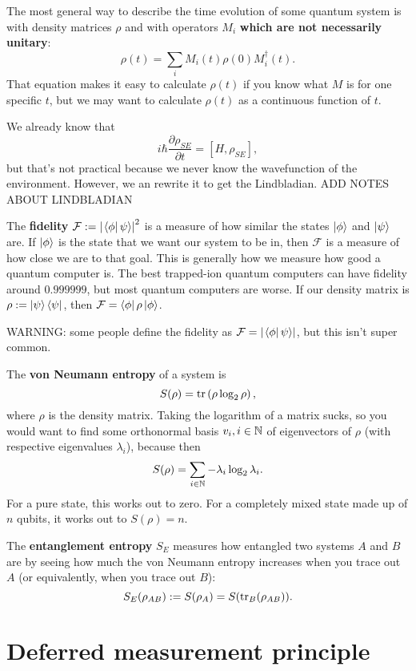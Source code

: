 \documentclass{article}
\begin{document}
\par
The most general way to describe the time evolution of some quantum system is with density matrices $\rho$ and with operators $M_i$ \textbf{which are not necessarily unitary}:
\[ \rho(t) = \sum_i M_i(t) \rho(0) M_i^\dag(t). \]
That equation makes it easy to calculate $\rho(t)$ if you know what $M$ is for one specific $t$, but we may want to calculate $\rho(t)$ as a continuous function of $t$.
\par
We already know that
\[ i\hbar \frac{\partial \rho_{SE}}{\partial t} = \left[ H, \rho_{SE} \right], \]
but that's not practical because we never know the wavefunction of the environment. However, we an rewrite it to get the Lindbladian. ADD NOTES ABOUT LINDBLADIAN
\par
The \textbf{fidelity} $\mathcal{F} := \left\lvert \left.\left\langle \phi\right\vert \psi \right\rangle \right\rvert^2$ is a measure of how similar the states $\left\lvert \phi \right\rangle$ and $\left\lvert \psi \right\rangle$ are. If $\left\lvert \phi \right\rangle$ is the state that we want our system to be in, then $\mathcal{F}$ is a measure of how close we are to that goal. This is generally how we measure how good a quantum computer is. The best trapped-ion quantum computers can have fidelity around $0.999999$, but most quantum computers are worse. If our density matrix is $\rho := \left\lvert \psi \right\rangle\left\langle \psi \right\rvert$, then $\mathcal{F} = \left\langle \phi \right\rvert\rho\left\lvert \phi \right\rangle$.
\begin{note}
    WARNING: some people define the fidelity as $\mathcal{F} = \left\lvert \left.\left\langle \phi\right\vert \psi \right\rangle \right\rvert$, but this isn't super common.
\end{note}
The \textbf{von Neumann entropy} of a system is
\[ S(\rho) = \operatorname{tr} \left( \rho \log_2 \rho \right), \]
where $\rho$ is the density matrix. Taking the logarithm of a matrix sucks, so you would want to find some orthonormal basis $v_i, i \in \mathbb{N}$ of eigenvectors of $\rho$ (with respective eigenvalues $\lambda_i$), because then
\[ S(\rho) = \sum_{i \in \mathbb{N}} - \lambda_i \log_2 \lambda_i. \]
For a pure state, this works out to zero. For a completely mixed state made up of $n$ qubits, it works out to $S(\rho)=n$.
\par
The \textbf{entanglement entropy} $S_E$ measures how entangled two systems $A$ and $B$ are by seeing how much the von Neumann entropy increases when you trace out $A$ (or equivalently, when you trace out $B$):
\[ S_E(\rho_{AB}) := S(\rho_A) = S(\operatorname{tr}_B(\rho_{AB})). \]


\section{Deferred measurement principle}
\end{document}
